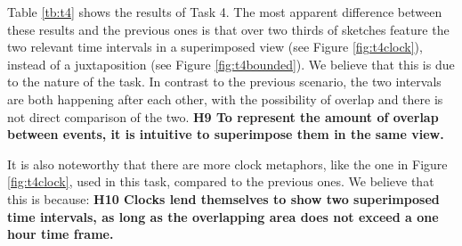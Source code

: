 Table \ref{tb:t4} shows the results of Task 4. The most apparent difference between these results and the previous ones is that over two thirds of sketches feature the two relevant time intervals in a superimposed view (see Figure \ref{fig:t4clock}), instead of a juxtaposition (see Figure \ref{fig:t4bounded}). We believe that this is due to the nature of the task. In contrast to the previous scenario, the two intervals are both happening after each other, with the possibility of overlap and there is not direct comparison of the two. \textbf{H9 To represent the amount of overlap between events, it is intuitive to superimpose them in the same view.}\par \medskip

It is also noteworthy that there are more clock metaphors, like the one in Figure \ref{fig:t4clock}, used in this task, compared to the previous ones. We believe that this is because: \textbf{H10 Clocks lend themselves to show two superimposed time intervals, as long as the overlapping area does not exceed a one hour time frame.} \par \medskip


